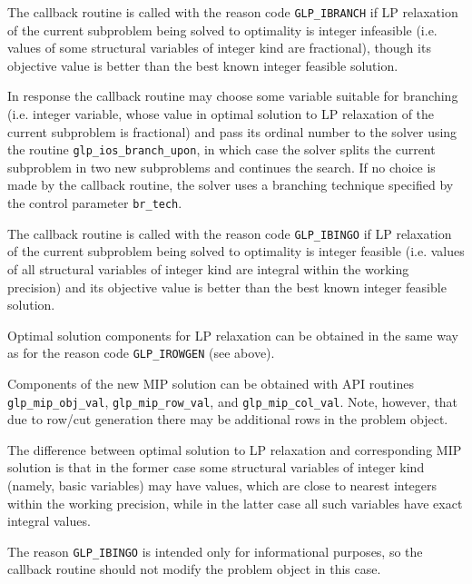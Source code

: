
The callback routine is called with the reason code \verb|GLP_IBRANCH|
if LP relaxation of the current subproblem being solved to optimality
is integer infeasible (i.e. values of some structural variables of
integer kind are fractional), though its objective value is better than
the best known integer feasible solution.

In response the callback routine may choose some variable suitable for
branching (i.e. integer variable, whose value in optimal solution to
LP relaxation of the current subproblem is fractional) and pass its
ordinal number to the solver using the routine
\verb|glp_ios_branch_upon|, in which case the solver splits the current
subproblem in two new subproblems and continues the search.
If no choice is made by the callback routine, the solver uses
a branching technique specified by the control parameter \verb|br_tech|.


The callback routine is called with the reason code \verb|GLP_IBINGO|
if LP relaxation of the current subproblem being solved to optimality
is integer feasible (i.e. values of all structural variables of integer
kind are integral within the working precision) and its objective value
is better than the best known integer feasible solution.

Optimal solution components for LP relaxation can be obtained in the
same way as for the reason code \verb|GLP_IROWGEN| (see above).

Components of the new MIP solution can be obtained with API routines
\verb|glp_mip_obj_val|, \verb|glp_mip_row_val|, and
\verb|glp_mip_col_val|. Note, however, that due to row/cut generation
there may be additional rows in the problem object.

The difference between optimal solution to LP relaxation and
corresponding MIP solution is that in the former case some structural
variables of integer kind (namely, basic variables) may have values,
which are close to nearest integers within the working precision, while
in the latter case all such variables have exact integral values.

The reason \verb|GLP_IBINGO| is intended only for informational
purposes, so the callback routine should not modify the problem object
in this case.


\newpage

